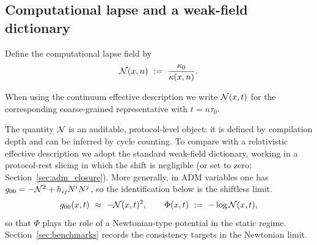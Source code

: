 \subsection{Computational lapse and a weak-field dictionary}
\label{subsec:lapse_dictionary}

\begin{definition}
\label{def:computational_lapse}
Define the computational lapse field by
\begin{equation}
  \lapse(x,n)\ :=\ \frac{\kappa_0}{\kappa(x,n)}.
\end{equation}
\end{definition}

When using the continuum effective description we write $\mathcal{N}(x,t)$ for the corresponding coarse-grained representative with $t=n\tau_0$.

The quantity $\mathcal{N}$ is an auditable, protocol-level object: it is defined by compilation depth and can be inferred by cycle counting.
To compare with a relativistic effective description we adopt the standard weak-field dictionary, working in a protocol-rest slicing in which the shift is negligible (or set to zero; Section~\ref{sec:adm_closure}).
More generally, in ADM variables one has $g_{00}=-\mathcal{N}^2+h_{ij}N^iN^j$, so the identification below is the shiftless limit.
\begin{equation}
  g_{00}(x,t)\ \approx\ -\mathcal{N}(x,t)^2,
  \qquad
  \Phi(x,t)\ :=\ -\log \mathcal{N}(x,t),
\end{equation}
so that $\Phi$ plays the role of a Newtonian-type potential in the static regime.
Section~\ref{sec:benchmarks} records the consistency targets in the Newtonian limit.


